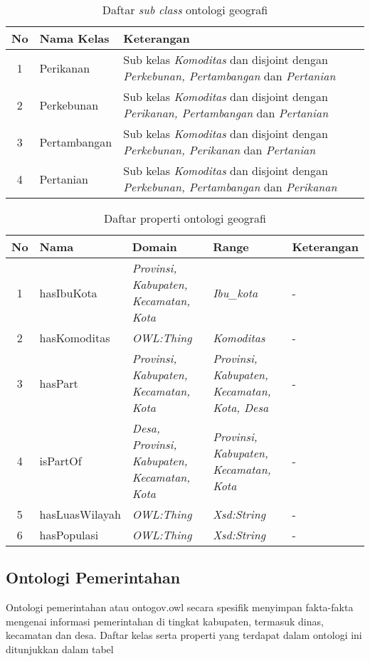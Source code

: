 \begin{table}[ht]
	\caption{Daftar \emph{sub class} ontologi geografi}
	\label{table:sub_class_ontogeo}
	\begin{tabularx}{\textwidth}{|c|l|X|}
		\hline
		\textbf{No} & \textbf{Nama Kelas} & \textbf{Keterangan} \\
		\hline
		1 & Perikanan & Sub kelas \emph{Komoditas} dan disjoint dengan \emph{Perkebunan, Pertambangan} dan \emph{Pertanian}\\
		\hline
		2 & Perkebunan & Sub kelas \emph{Komoditas} dan disjoint dengan \emph{Perikanan, Pertambangan} dan \emph{Pertanian} \\
		\hline
		3 & Pertambangan & Sub kelas \emph{Komoditas} dan disjoint dengan \emph{Perkebunan, Perikanan} dan \emph{Pertanian} \\
		\hline
		4 & Pertanian & Sub kelas \emph{Komoditas} dan disjoint dengan \emph{Perkebunan, Pertambangan} dan \emph{Perikanan} \\
		\hline
	\end{tabularx}
\end{table}

\begin{table}[tb]
	\caption{Daftar properti ontologi geografi}
	\label{tab:ontogeo_property}
	\centering

	\begin{tabularx}{\textwidth}{|c|l|X|X|X|}
	\hline

	\hline
	\textbf{No} & \textbf{Nama} & \textbf{Domain} & \textbf{Range} & \textbf{Keterangan} \\
	\hline
		1 & hasIbuKota & \emph{Provinsi, Kabupaten, Kecamatan, Kota} & \emph{Ibu\_kota} & - \\
	\hline
		2 & hasKomoditas & \emph{OWL:Thing} & \emph{Komoditas} & - \\
	\hline
		3 & hasPart &\emph{Provinsi, Kabupaten, Kecamatan, Kota} & \emph{Provinsi, Kabupaten, Kecamatan, Kota, Desa} & - \\
	\hline
		4 & isPartOf & \emph{Desa, Provinsi, Kabupaten, Kecamatan, Kota} & \emph{Provinsi, Kabupaten, Kecamatan, Kota} & - \\
	\hline
		5 & hasLuasWilayah & \emph{OWL:Thing} & \emph{Xsd:String} & - \\
	\hline
		6 & hasPopulasi & \emph{OWL:Thing} & \emph{Xsd:String} & - \\
	\hline
	\end{tabularx}
\end{table}


\subsection{Ontologi Pemerintahan}
Ontologi pemerintahan atau ontogov.owl secara spesifik menyimpan fakta-fakta mengenai informasi pemerintahan di tingkat kabupaten, termasuk dinas, kecamatan dan desa. Daftar kelas serta properti yang terdapat dalam ontologi ini ditunjukkan dalam tabel


